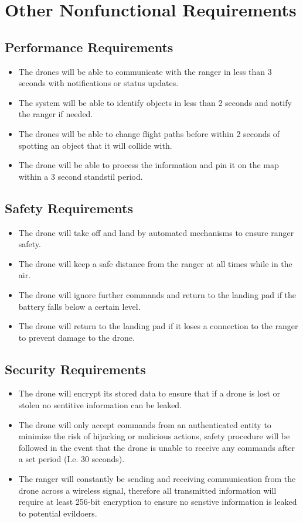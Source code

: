 \chapter{Other Nonfunctional Requirements}

\section{Performance Requirements}
\begin{itemize}
	\item The drones will be able to communicate with the ranger in less than 3 seconds with notifications or status updates.
	\item The system will be able to identify objects in less than 2 seconds and notify the ranger if needed.
	\item The drones will be able to change flight paths before within 2 seconds of spotting an object that it will collide with.
	\item The drone will be able to process the information and pin it on the map within a 3 second standstil period.
\end{itemize}

\section{Safety Requirements}
\begin{itemize}
	\item The drone will take off and land by automated mechanisms to ensure ranger safety.
	\item The drone will keep a safe distance from the ranger at all times while in the air.
	\item The drone will ignore further commands and return to the landing pad if the battery falls below a certain level.
	\item The drone will return to the landing pad if it loses a connection to the ranger to prevent damage to the drone.
\end{itemize}

\section{Security Requirements}
\begin{itemize}
	\item The drone will encrypt its stored data to ensure that if a drone is lost or stolen no sentitive information can be leaked.
	\item The drone will only accept commands from an authenticated entity to minimize the risk of hijacking or malicious actions, safety procedure will be followed in the event that the drone is unable to receive any commands after a set period (I.e. 30 seconds).
	\item The ranger will constantly be sending and receiving communication from the drone across a wireless signal, therefore all transmitted information will require at least 256-bit encryption to ensure no senstive information is leaked to potential evildoers.
\end{itemize}

